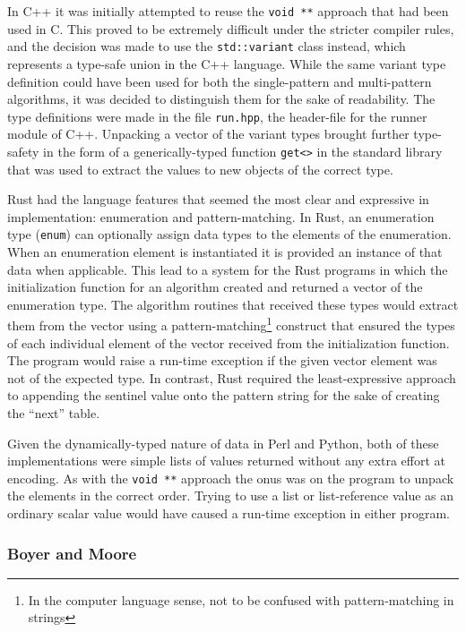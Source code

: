 In C++ it was initially attempted to reuse the \texttt{void **} approach that had been used in C. This proved to be extremely difficult under the stricter compiler rules, and the decision was made to use the \texttt{std::variant} class instead, which represents a type-safe union in the C++ language. While the same variant type definition could have been used for both the single-pattern and multi-pattern algorithms, it was decided to distinguish them for the sake of readability. The type definitions were made in the file \texttt{run.hpp}, the header-file for the runner module of C++. Unpacking a vector of the variant types brought further type-safety in the form of a generically-typed function \texttt{get<>} in the standard library that was used to extract the values to new objects of the correct type.

Rust had the language features that seemed the most clear and expressive in implementation: enumeration and pattern-matching. In Rust, an enumeration type (\texttt{enum}) can optionally assign data types to the elements of the enumeration. When an enumeration element is instantiated it is provided an instance of that data when applicable. This lead to a system for the Rust programs in which the initialization function for an algorithm created and returned a vector of the enumeration type. The algorithm routines that received these types would extract them from the vector using a pattern-matching\footnote{In the computer language sense, not to be confused with pattern-matching in strings} construct that ensured the types of each individual element of the vector received from the initialization function. The program would raise a run-time exception if the given vector element was not of the expected type. In contrast, Rust required the least-expressive approach to appending the sentinel value onto the pattern string for the sake of creating the ``next'' table.

Given the dynamically-typed nature of data in Perl and Python, both of these implementations were simple lists of values returned without any extra effort at encoding. As with the \texttt{void **} approach the onus was on the program to unpack the elements in the correct order. Trying to use a list or list-reference value as an ordinary scalar value would have caused a run-time exception in either program.

\subsubsection{Boyer and Moore}

